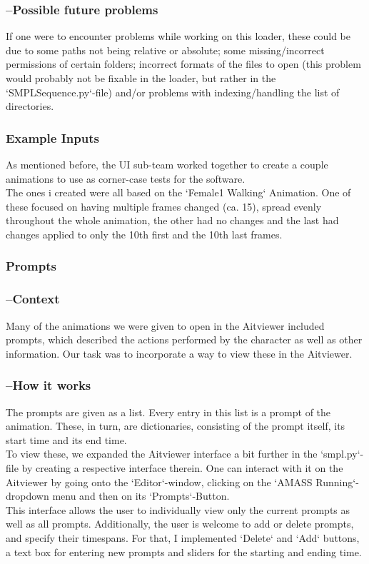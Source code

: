 \documentclass[a4paper]{scrartcl}
\begin{document}
\subsubsection*{--Possible future problems}
If one were to encounter problems while working on this loader, these could be due to some paths not being relative or absolute; some missing/incorrect permissions of certain folders; incorrect formats of the files to open (this problem would probably not be fixable in the loader, but rather in the `SMPLSequence.py`-file) and/or problems with indexing/handling the list of directories.

\subsubsection*{Example Inputs}
As mentioned before, the UI sub-team worked together to create a couple animations to use as corner-case tests for the software.\\
The ones i created were all based on the `Female1 Walking` Animation. One of these focused on having multiple frames changed (ca. 15), spread evenly throughout the whole animation, the other had no changes and the last had changes applied to only the 10th first and the 10th last frames.

\subsubsection*{Prompts}
\subsubsection*{--Context}
Many of the animations we were given to open in the Aitviewer included prompts, which described the actions performed by the character as well as other information. Our task was to incorporate a way to view these in the Aitviewer.

\subsubsection*{--How it works}
The prompts are given as a list. Every entry in this list is a prompt of the animation. These, in turn, are dictionaries, consisting of the prompt itself, its start time and its end time.\\
To view these, we expanded the Aitviewer interface a bit further in the `smpl.py`-file by creating a respective interface therein. One can interact with it on the Aitviewer by going onto the `Editor`-window, clicking on the `AMASS Running`-dropdown menu and then on its `Prompts`-Button.\\
This interface allows the user to individually view only the current prompts as well as all prompts. Additionally, the user is welcome to add or delete prompts, and specify their timespans. For that, I implemented `Delete` and `Add` buttons, a text box for entering new prompts and sliders for the starting and ending time.
\end{document}
